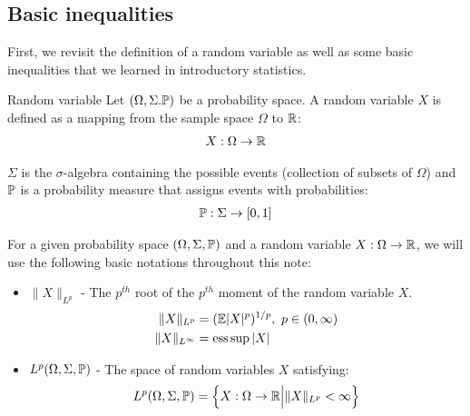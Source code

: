 \subsection{Basic inequalities}
First, we revisit the definition of a random variable as well as some basic inequalities that we
learned in introductory statistics.

\begin{definition}{Random variable}
    Let $(\Omega, \Sigma. \mathbb{P})$ be a probability space. A random variable $X$ is defined as a mapping from the sample space $\Omega$ to $\mathbb{R}$:
    \begin{align}
        X:\Omega \to \mathbb{R}
    \end{align}

    \noindent $\Sigma$ is the $\sigma$-algebra containing the possible events (collection of subsets of $\Omega$) and $\mathbb{P}$ is a probability measure that assigns events with probabilities:
    \begin{align}
        \mathbb{P}: \Sigma \to [0,1]
    \end{align}
\end{definition}

\noindent For a given probability space $(\Omega, \Sigma, \mathbb{P})$ and a random variable $X:\Omega\to\mathbb{R}$, we will use the following basic notations throughout this note:
\begin{itemize}
    \item $\|X\|_{L^p}$ - The $p^{th}$ root of the $p^{th}$ moment of the random variable $X$.
    \begin{align}
        \|X\|_{L^p} &= (\mathbb{E}|X|^p)^{1/p}, \ p \in (0,\infty) \\
        \|X\|_{L^\infty} &= \operatorname*{ess\,sup} |X|
    \end{align}

    \item $L^p(\Omega, \Sigma, \mathbb{P})$ -  The space of random variables $X$ satisfying:
    \begin{align}
        L^p(\Omega, \Sigma, \mathbb{P}) = \Big\{ 
            X : \Omega\to\mathbb{R} \Big| \|X\|_{L^p} < \infty
         \Big\}
    \end{align}
\end{itemize}

